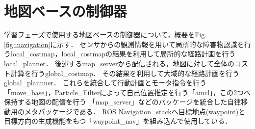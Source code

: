 
  
    

\newpage
\section{地図ベースの制御器}
    \label{seigyo}
    学習フェーズで使用する地図ベースの制御器について，概要をFig. \ref{fig::navigation}に示す．
    センサからの観測情報を用いて局所的な障害物認識を行うlocal\_costmap，local\_costmapの結果を利用して局所的な経路計画を行うlocal\_planner．
    後述するmap\_serverから配信される，地図に対して全体のコスト計算を行うglobal\_costmap．
    その結果を利用して大域的な経路計画を行うglobal\_plannner．
    これらを統合して行動計画とモータ指令を行う「move\_base」，Particle\_Filterによって自己位置推定を行う「amcl」，この2つへ保持する地図の配信を行う
    「map\_server」などのパッケージを統合した自律移動用のメタパッケージである．
    ROS Navigation\_stack\cite{navigation:online}へ目標地点(waypoint)と目標方向の生成機能をもつ「waypoint\_nav」を組み込んで使用している．
    
